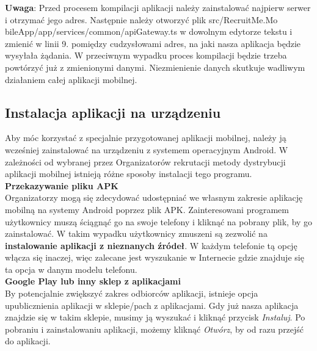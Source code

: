 \documentclass{article}
\begin{document}
\textbf{Uwaga}: Przed procesem kompilacji aplikacji należy zainstalować najpierw serwer i otrzymać jego adres. Następnie należy otworzyć plik src/RecruitMe.Mo \linebreak bileApp/app/services/common/apiGateway.ts w dowolnym edytorze tekstu i zmienić w linii 9. pomiędzy cudzysłowami adres, na jaki nasza aplikacja będzie wysyłała żądania. W przeciwnym wypadku proces kompilacji będzie trzeba powtórzyć już z zmienionymi danymi. Niezmienienie danych skutkuje wadliwym działaniem całej aplikacji mobilnej.

\subsection{Instalacja aplikacji na urządzeniu}
Aby móc korzystać z specjalnie przygotowanej aplikacji mobilnej, należy ją wcześniej zainstalować na urządzeniu z systemem operacyjnym Android.
W zależności od wybranej przez Organizatorów rekrutacji metody dystrybucji aplikacji mobilnej istnieją różne sposoby instalacji tego programu. \\

\textbf{Przekazywanie pliku APK} \\
Organizatorzy mogą się zdecydować udostępniać we własnym zakresie aplikację mobilną na systemy Android poprzez plik APK. Zainteresowani programem użytkownicy muszą ściągnąć go na swoje telefony i kliknąć na pobrany plik, by go zainstalować. W takim wypadku użytkownicy zmuszeni są zezwolić na \textbf{instalowanie aplikacji z nieznanych źródeł}. W każdym telefonie tą opcję włącza się inaczej, więc zalecane jest wyszukanie w Internecie gdzie znajduje się ta opcja w danym modelu telefonu. \\

\textbf{Google Play lub inny sklep z aplikacjami} \\
By potencjalnie zwiększyć zakres odbiorców aplikacji, istnieje opcja  \linebreak upublicznienia aplikacji w sklepie/pach z aplikacjami. Gdy już nasza aplikacja znajdzie się w takim sklepie, musimy ją wyszukać i kliknąć przycisk \emph{Instaluj}. Po pobraniu i zainstalowaniu aplikacji, możemy kliknąć \emph{Otwórz}, by od razu przejść \linebreak do aplikacji.
\end{document}
